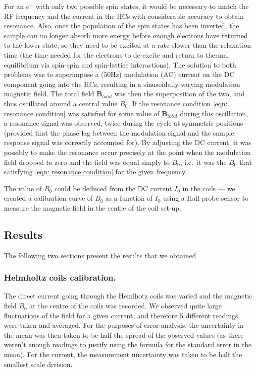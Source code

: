 \documentclass[a4paper]{jpconf}
\numberwithin{equation}{section}
\begin{document}
For an $e^-$ with only two possible spin states, it would be necessary to match the RF frequency and the current in the HCs with considerable accuracy to obtain resonance. Also, once the population of the spin states has been inverted, the sample can no longer absorb more energy before enough electrons have returned to the lower state, so they need to be excited at a rate slower than the relaxation time (the time needed for the electrons to de-excite and return to thermal equilibrium via spin-spin and spin-lattice interactions). The solution to both problems was to superimpose a ($50 \si{\hertz}$) modulation (AC) current on the DC component going into the HCs, resulting in a sinusoidally-varying modulation magnetic field. The total field $\mathbf{B}_{total}$ was then the superposition of the two, and thus oscillated around a central value $B_0$. If the resonance condition \eqref{eqn: resonance condition} was satisfied for some value of $\mathbf{B}_{total}$ during this oscillation, a resonance signal was observed, twice during the cycle at symmetric positions (provided that the phase lag between the modulation signal and the sample response signal was correctly accounted for). By adjusting the DC current, it was possibly to make the resonance occur precisely at the point when the modulation field dropped to zero and the field was equal simply to $B_0$, i.e.\ it was the $B_0$ that satisfying \eqref{eqn: resonance condition} for the given frequency.

The value of $B_0$ could be deduced from the DC current $I_0$ in the coils --- we created a calibration curve of $B_0$ as a function of $I_0$ using a Hall probe sensor to measure the magnetic field in the centre of the coil set-up.

\subsection{Results}
The following two sections present the results that we obtained.

\subsubsection{Helmholtz coils calibration.}
The direct current going through the Hemlhotz coils was varied and the magnetic field $B_0$ at the centre of the coils was recorded. We observed quite large fluctuations of the field for a given current, and therefore 5 different readings were taken and averaged. For the purposes of error analysis, the uncertainty in the mean was then taken to be half the spread of the observed values (as there weren't enough readings to justify using the formula for the standard error in the mean). For the current, the measurement uncertainty was taken to be half the smallest scale division. 
\end{document}
